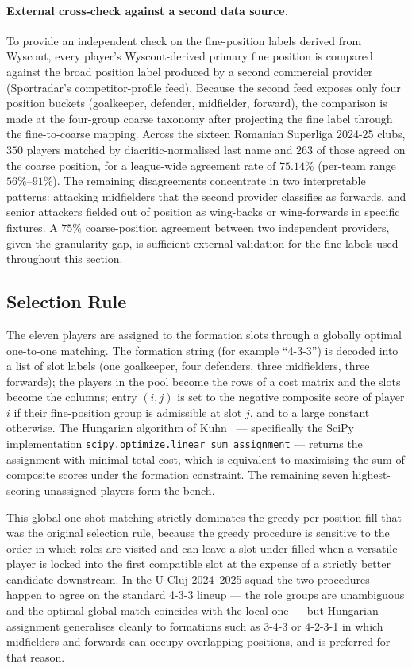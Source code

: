 \paragraph{External cross-check against a second data source.}
To provide an independent check on the fine-position labels derived from Wyscout, every player's Wyscout-derived primary fine position is compared against the broad position label produced by a second commercial provider (Sportradar's competitor-profile feed). Because the second feed exposes only four position buckets (goalkeeper, defender, midfielder, forward), the comparison is made at the four-group coarse taxonomy after projecting the fine label through the fine-to-coarse mapping. Across the sixteen Romanian Superliga 2024-25 clubs, $350$ players matched by diacritic-normalised last name and $263$ of those agreed on the coarse position, for a league-wide agreement rate of $\mathbf{75.14\%}$ (per-team range $56\%$--$91\%$). The remaining disagreements concentrate in two interpretable patterns: attacking midfielders that the second provider classifies as forwards, and senior attackers fielded out of position as wing-backs or wing-forwards in specific fixtures. A $75\%$ coarse-position agreement between two independent providers, given the granularity gap, is sufficient external validation for the fine labels used throughout this section.

\subsection{Selection Rule}
\label{subsec:xi_selection}

The eleven players are assigned to the formation slots through a globally optimal one-to-one matching. The formation string (for example ``4-3-3'') is decoded into a list of slot labels (one goalkeeper, four defenders, three midfielders, three forwards); the players in the pool become the rows of a cost matrix and the slots become the columns; entry $(i, j)$ is set to the negative composite score of player $i$ if their fine-position group is admissible at slot $j$, and to a large constant otherwise. The Hungarian algorithm of Kuhn~\cite{kuhn1955hungarian} --- specifically the SciPy implementation \texttt{scipy.optimize.linear\_sum\_assignment} --- returns the assignment with minimal total cost, which is equivalent to maximising the sum of composite scores under the formation constraint. The remaining seven highest-scoring unassigned players form the bench.

This global one-shot matching strictly dominates the greedy per-position fill that was the original selection rule, because the greedy procedure is sensitive to the order in which roles are visited and can leave a slot under-filled when a versatile player is locked into the first compatible slot at the expense of a strictly better candidate downstream. In the U Cluj 2024--2025 squad the two procedures happen to agree on the standard 4-3-3 lineup --- the role groups are unambiguous and the optimal global match coincides with the local one --- but Hungarian assignment generalises cleanly to formations such as 3-4-3 or 4-2-3-1 in which midfielders and forwards can occupy overlapping positions, and is preferred for that reason.

